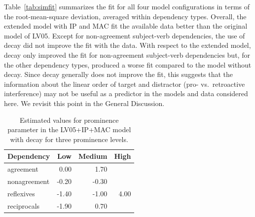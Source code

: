 \documentclass{cambridge7A}\usepackage[]{graphicx}\usepackage[]{color}
\newcommand{\revFE}[1]{#1}
\begin{document}
Table~\ref{tab:simfit} summarizes the fit for all four model configurations in terms of the \revFE{root-mean-square deviation}, averaged within dependency types.
Overall, the extended model with IP and MAC fit the available data better than the original model of LV05. 
Except for non-agreement subject-verb dependencies, the use of decay did not improve the fit with the data. 
With respect to the extended model, decay only improved the fit for non-agreement subject-verb dependencies but, for the other dependency types, produced a worse fit compared to the model without decay. 
Since decay generally does not improve the fit, this suggests that the information about the linear order of target and distractor (pro- vs.\ retroactive interference) may not be useful as a predictor in the models and data considered here. 
We revisit this point in the General Discussion.








\begin{table}[ht]
\centering
\caption{Estimated values for prominence parameter in the LV05+IP+MAC model with decay for three prominence levels.} 
\label{tab:promtab}
\begin{tabular}{lrrr}
Dependency & Low & Medium & High \\ 
\hline
agreement & 0.00 & 1.70 &  \\ 
  nonagreement & -0.20 & -0.30 &  \\ 
  reflexives & -1.40 & -1.00 & 4.00 \\ 
  reciprocals & -1.90 & 0.70 &  \\ 
\end{tabular}
\end{table}
\end{document}

